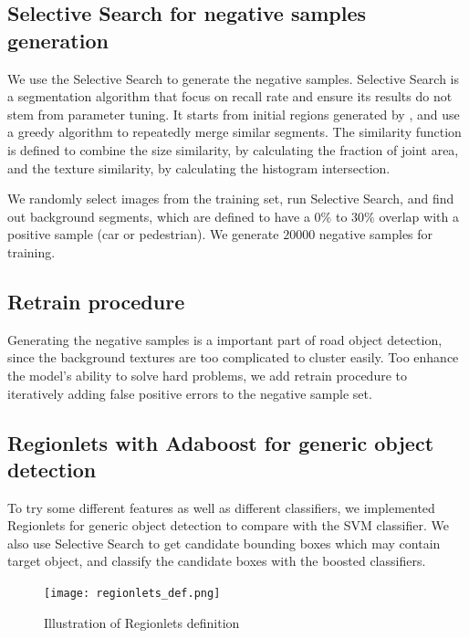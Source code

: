 \documentclass{article} %
\begin{document}
\subsection{Selective Search for negative samples generation}

We use the Selective Search \cite{van2011segmentation} to generate the negative samples. Selective Search is a segmentation algorithm that focus on recall rate and ensure its results do not stem from parameter tuning. It starts from initial regions generated by \cite{felzenszwalb2004efficient}, and use a greedy algorithm to repeatedly merge similar segments. The similarity function is defined to combine the size similarity, by calculating the fraction of joint area, and the texture similarity, by calculating the histogram intersection.

We randomly select images from the training set, run Selective Search, and find out background segments, which are defined to have a $0\%$ to $30\%$ overlap with a positive sample (car or pedestrian). We generate $20000$ negative samples for training. 

\subsection{Retrain procedure}

Generating the negative samples is a important part of road object detection, since the background textures are too complicated to cluster easily. Too enhance the model's ability to solve hard problems, we add retrain procedure \cite{felzenszwalb2010object} to iteratively adding false positive errors to the negative sample set.


\subsection{Regionlets with Adaboost for generic object detection}

To try some different features as well as different classifiers, we implemented Regionlets \cite{Wang2013} for generic object detection to compare with the SVM classifier. We also use Selective Search \cite{van2011segmentation} to get candidate bounding boxes which may contain target object, and classify the candidate boxes with the boosted classifiers.


\begin{figure}[htb]
	\centering
	\texttt{[image: regionlets\_def.png]}
	\caption{Illustration of Regionlets definition}
	\label{fig:regionlet_def}
\end{figure}
\end{document}
